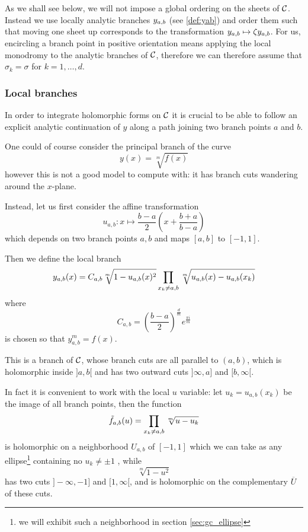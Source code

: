 \documentclass[main.tex]{subfiles}
\begin{document}
  As we shall see below, we
  will not impose a global ordering on the sheets of $\mathcal{C}$. Instead we use
  locally analytic branches $y_{a,b}$ (see \ref{def:yab}) and order them such that
  moving one sheet up corresponds to the transformation $y_{a,b} \mapsto
  \zeta y_{a,b}$. For us, encircling a branch point in positive orientation means
  applying the local monodromy to the analytic branches of $\mathcal{C}$, therefore we
  can therefore assume that $\sigma_k = \sigma$ for $k = 1,\dots,d$.
 
  \subsubsection{Local branches}
  
  In order to integrate holomorphic forms on $\mathcal{C}$
  it is crucial to be able to follow an explicit analytic continuation of $y$ along a
  path joining two branch points $a$ and $b$.
  
  One could of course consider the principal branch of the curve
  \begin{equation}
      y(x) = \sqrt[m]{f(x)}
  \end{equation}
  however this is not a good model to compute with: it has branch cuts
  wandering around the $x$-plane.

  Instead, let us first consider the affine transformation
  \begin{equation}
      \label{def:uab}
      u_{a,b} : x \mapsto \frac{b-a}{2}\left(x+\frac{b+a}{b-a}\right) 
  \end{equation}
  which depends on two branch points $a,b$ and maps $[a,b]$ to $[-1,1]$.

  Then we define the local branch
  \begin{equation}
      \label{def:yab}
      y_{a,b}(x) =   C_{a,b} \sqrt[m]{1 - u_{a,b}(x)^2}
      \prod_{x_k\neq a,b}\sqrt[m]{u_{a,b}(x)-u_{a,b}(x_k)}
  \end{equation}
  where
  \begin{equation}
      C_{a,b} = \left(\frac{b-a}{2}\right)^{\frac{d}{m}} e^{\frac{\pi i}{m}}
  \end{equation}
  is chosen so that $y_{a,b}^m = f(x)$.

  This is a branch of $\mathcal{C}$, whose branch cuts are all parallel to $(a,b)$,
  which is holomorphic inside $]a,b[$ and has two outward cuts $]\infty, a]$ and $[b,\infty[$.

  In fact it is convenient to work with the local $u$ variable: let $u_k = u_{a,b}(x_k)$ be the image
  of all branch points, then the function
  \begin{equation}
      \tilde{f}_{a,b}(u) = \prod_{x_k \ne a,b} \sqrt[m]{u - u_k}
  \end{equation}
  is holomorphic on a neighborhood $U_{a,b}$ of $[-1,1]$ which we can take as
  any ellipse\footnote{we will exhibit such a neighborhood in section \ref{sec:gc_ellipse}}
  containing no $u_k\neq\pm1$ , while
  \begin{equation}
      \sqrt[m]{1-u^2}
  \end{equation}
  has two cuts $]-\infty,-1]$ and $[1,\infty[$, and is holomorphic on the complementary
  $\overline U$ of these cuts.
\end{document}
